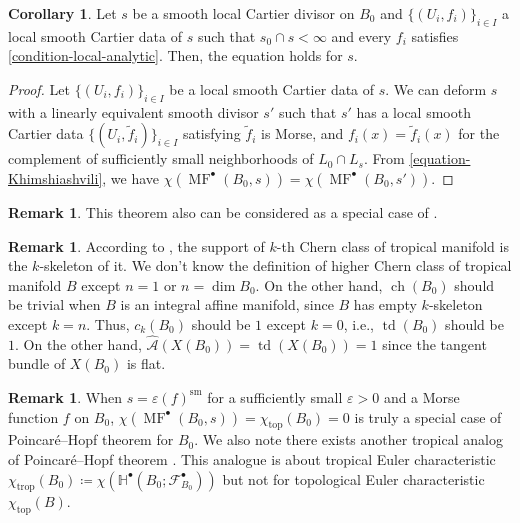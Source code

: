 \documentclass[a4paper,dvipdfmx,reqno,12pt]{amsart}
\theoremstyle{definition}
\newtheorem{corollary}[theorem]{Corollary}
\newtheorem{remark}[theorem]{Remark}
\newcommand{\deq}{\coloneqq}
\newcommand{\vep}{\varepsilon}%
\newcommand{\mb}[1]{\mathbb{#1}}%
\newcommand{\mcal}[1]{\mathcal{#1}}%
\newcommand{\opn}[1]{\operatorname{#1}}
\numberwithin{equation}{section}
\begin{document}
\begin{corollary}
Let $s$ be a smooth local Cartier divisor on $B_0$ and 
$\{(U_i,f_i)\}_{i\in I}$ a local smooth Cartier 
data of $s$ such that $s_0\cap s<\infty$ and
every $f_i$ satisfies \cref{condition-local-analytic}.
Then, the equation holds for $s$.
\end{corollary}

\begin{proof}
Let $\{(U_i,f_i)\}_{i\in I}$ be a local smooth Cartier
data of $s$. We can deform $s$ with a linearly equivalent
smooth divisor $s'$ 
such that $s'$ has a local smooth Cartier data 
$\{(U_i,\tilde{f}_i)\}_{i\in I}$ satisfying 
$\tilde{f}_i$ is Morse, and 
$f_i(x)=\tilde{f}_i(x)$ for the complement of 
sufficiently small neighborhoods of $L_0\cap L_s$. 
From \cref{equation-Khimshiashvili}, we have
$\chi(\opn{MF}^{\bullet}(B_0,s))
=\chi(\opn{MF}^{\bullet}(B_0,s'))$.
\end{proof}

\begin{remark} \label{rmk: integral_mirror}
This theorem also can be considered as
a special case of \cite{MR4301560}.
\end{remark}

\begin{remark}

According to \cite[5.3]{mikhalkinTropicalGeometryIts2006},
the support of $k$-th Chern class of tropical manifold is 
the $k$-skeleton of it.
We don't know the definition of higher Chern class of tropical manifold $B$ except
$n=1$ or $n=\dim B_0$. 
On the other hand, $\opn{ch}(B_0)$ should be trivial when $B$ is
an integral affine manifold, since $B$ has empty
$k$-skeleton except $k=n$.
Thus, $c_{k}(B_0)$ should be $1$ except $k=0$, 
i.e., $\opn{td}(B_0)$ should be $1$. 
On the other hand, $\hat{\mcal{A}}(X(B_0))=\opn{td}(X(B_0))=1$
since the tangent bundle of $X(B_0)$ is flat.
\end{remark}

\begin{remark}
When $s=\vep (f)^{\opn{sm}}$ for a sufficiently small $\vep >0$ and 
a Morse function $f$ on $B_0$, 
$\chi(\opn{MF}^{\bullet}(B_0,s))=
\chi_{\opn{top}}(B_0)=0$ is 
truly a special case of Poincar\'e--Hopf theorem for $B_0$.
We also note there exists another tropical analog of Poincar\'e--Hopf theorem
  \cite{rau2020tropical}. This analogue is about tropical Euler characteristic
$\chi_{\opn{trop}}(B_0)\deq 
\chi(\mb{H}^{\bullet}(B_0;\mcal{F}_{B_0}^{\bullet}))$
  but not for topological Euler characteristic $\chi_{\opn{top}}(B)$.
\end{remark}
\end{document}
